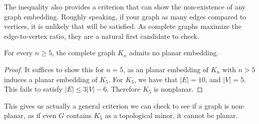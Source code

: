 The inequality also provides a criterion that can show the non-existence of any graph embedding. Roughly speaking, if your graph as many edges compared to vertices, it is unlikely that  will be satisfied. As complete graphs maximize the edge-to-vertex ratio, they are a natural first candidate to check. 

\begin{corollary}
 For every $n\geq 5$, the complete graph $K_n$ admits no planar embedding. 
\end{corollary}

\begin{proof}
 It suffices to show this for $n=5$, as an planar embedding of $K_n$ with $n>5$ induces a planar embedding of $K_5$.  For $K_5$, we have that $|E|=10$, and $|V|=5$. This fails to satisfy $|E|\leq 3|V|-6$. Therefore $K_5$ is nonplanar. 
\end{proof}
This gives us actually a general criterion we can check to see if a graph is non-planar, as if even $G$ contains $K_5$ as a topological minor, it cannot be planar. 


